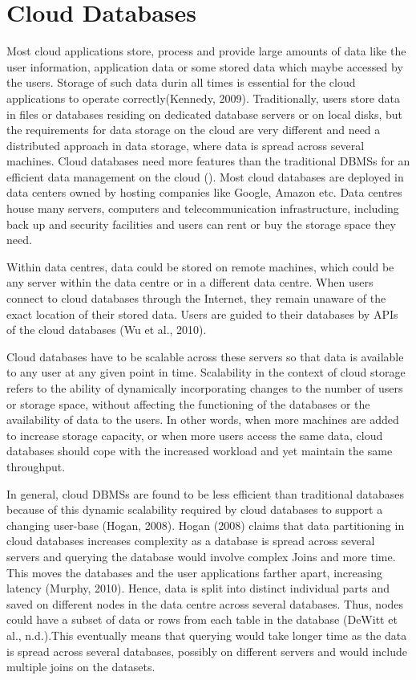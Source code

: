 \section{Cloud Databases}\label{s:cloud-databases}

Most cloud applications store, process and provide large amounts of data like
the user information, application data or some stored data which maybe accessed
by the users. Storage of such data durin all times is essential for the cloud
applications to operate correctly(Kennedy, 2009).
Traditionally, users store data in files or databases residing on dedicated
database servers or on local disks, but the requirements for data storage on the
cloud are very different and need a distributed approach in data storage, where
data is spread across several machines. Cloud databases need more features than
the traditional \acp{DBMS} for an efficient data management on the cloud
(). Most cloud databases are deployed in data centers owned
by hosting companies like Google, Amazon etc. Data centres house many servers,
computers and telecommunication infrastructure, including back up and security
facilities and users can rent or buy the storage space they need.

Within data centres, data could be stored on remote machines, which could be
any server within the data centre or in a different data centre. When users
connect to cloud databases through the Internet, they remain unaware of
the exact location of their stored data.  Users are guided to their
databases by \acp{API} of the cloud databases (Wu et al., 2010). 

Cloud databases have to be scalable across these servers so that data is
available to any user at any given point in time. Scalability in the context of
cloud storage refers to the ability of dynamically incorporating changes to the
number of users or storage space, without affecting the functioning of the
databases or the availability of data to the users. In other words, when more
machines are added to increase storage capacity, or when more users access the
same data, cloud databases should cope with the increased workload and yet
maintain the same throughput.

In general, cloud \acp{DBMS} are found to be less efficient than traditional
databases because of this dynamic scalability required by cloud databases to
support a changing user-base (Hogan, 2008). Hogan (2008) claims that data
partitioning in cloud databases increases complexity as a database is spread
across several servers and querying the database would involve complex Joins and
more time. This moves the databases and the user applications farther apart,
increasing latency (Murphy, 2010). Hence, data is split into distinct individual
parts and saved on different nodes in the data centre across several databases.
Thus, nodes could have a subset of data or rows from each table in the database
(DeWitt et al., n.d.).This eventually means that querying would take longer time
as the data is spread across several databases, possibly on different servers
and would include multiple joins on the datasets.

